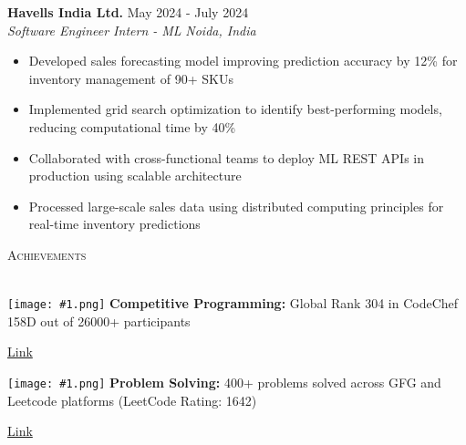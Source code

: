 \documentclass[a4paper]{article}
\newcommand{\bulletSep} { \vspace{1.5mm} }
\newcommand{\sectionSep} { \vspace{\stretch{1}} }
\newcommand{\lineunder} {
    \vspace*{-8pt} \\
    \hspace*{-15pt} \hrulefill \\
}
\newcommand{\header} [1] {
    {\hspace*{-18pt}\vspace*{6pt} {
        \fontfamily{qcs}\selectfont \large \scshape #1
    }}
    \vspace*{-6pt} \lineunder
    \vspace{1.1mm}
}
\newcommand{\experienceItem}[5]{
    \textbf{#1} \hfill #2 \\
    \textit{#3} \hfill \textit{#4} \\
    #5
}
\newcommand{\link}[2]{
    {\fontfamily{lmtt}\selectfont\href{#1}{#2}}
}
\newcommand{\image}[1]{
    \begingroup
    \normalfont
    \Large
    \texttt{[image: \#1.png]}%
    \endgroup
}
\begin{document}
\experienceItem{Havells India Ltd.}{May 2024 - July 2024}{Software Engineer Intern - ML}{Noida, India}{
\begin{itemize}
    \item Developed sales forecasting model improving prediction accuracy by 12\% for inventory management of 90+ SKUs
    \item Implemented grid search optimization to identify best-performing models, reducing computational time by 40\%
    \item Collaborated with cross-functional teams to deploy ML REST APIs in production using scalable architecture
    \item Processed large-scale sales data using distributed computing principles for real-time inventory predictions

\end{itemize}
}



\sectionSep


\header{Achievements}

    \image{codeforce} \textbf{Competitive Programming:} Global Rank 304 in CodeChef 158D out of 26000+ participants \hfill 
    \link{https://www.codechef.com/rankings/START158D?itemsPerPage=100&order=asc&page=1&search=pratikranaa&sortBy=rank}{Link}

\bulletSep
    \image{Leetcode} \textbf{Problem Solving:} 400+ problems solved across GFG and Leetcode platforms (LeetCode Rating: 1642) \hfill 
    \link{https://leetcode.com/u/ranapratik/}{Link}
\end{document}
